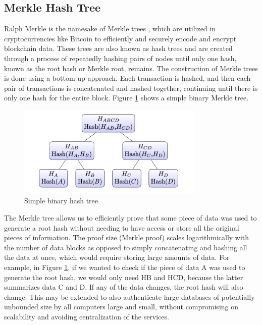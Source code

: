 \subsection{Merkle Hash Tree}

Ralph Merkle is the namesake of Merkle trees \cite{merkle_digital_signature}, which are utilized in cryptocurrencies like Bitcoin to efficiently and securely encode and encrypt blockchain data. These trees are also known as hash trees and are created through a process of repeatedly hashing pairs of nodes until only one hash, known as the root hash or Merkle root, remains. The construction of Merkle trees is done using a bottom-up approach. Each transaction is hashed, and then each pair of transactions is concatenated and hashed together, continuing until there is only one hash for the entire block. Figure \ref{fig:Simple binary hash tree.} shows a simple binary Merkle tree.

 \begin{figure}[H]
 \centering
  \includegraphics[width=0.8\textwidth]{simple binary hash tree.png}
  \caption{Simple binary hash tree.}
  \label{fig:Simple binary hash tree.}
\end{figure}

The Merkle tree allows us to efficiently prove that some piece of data was used to generate a root hash without needing to have access or store all the original pieces of information. The proof size (Merkle proof) scales logarithmically with the number of data blocks as opposed to simply concatenating and hashing all the data at once, which would require storing large amounts of data. For example, in Figure \ref{fig:Simple binary hash tree.}, if we wanted to check if the piece of data A was used to generate the root hash, we would only need \ac{HB} and \ac{HCD}, because the latter summarizes data C and D. If any of the data changes, the root hash will also change. This may be extended to also authenticate large databases of potentially unbounded size by all computers large and small, without compromising on scalability and avoiding centralization of the services.

